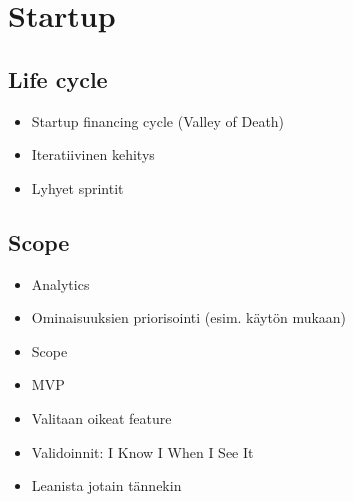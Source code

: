 
 \section{Startup}
 
 \subsection{Life cycle}

 \begin{itemize}

 \item Startup financing cycle (Valley of Death)
 \item Iteratiivinen kehitys
 \item Lyhyet sprintit
 
 \end{itemize}
 
 \subsection{Scope}
 
 \begin{itemize}
 
 \item Analytics
 \item Ominaisuuksien priorisointi (esim. käytön mukaan)
 \item Scope
 \item MVP
 \item Valitaan oikeat feature
 \item Validoinnit: I Know I When I See It
 \item Leanista jotain tännekin
 
 \end{itemize}
 